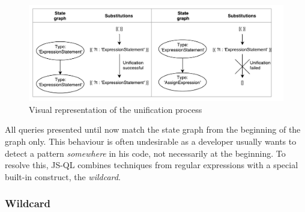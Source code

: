 \begin{figure}[!h]
    \centering
      \includegraphics[width=1\textwidth]{images/Unification} 
      \caption{Visual representation of the unification process}
    \label{fig:Unification}
\end{figure}

All queries presented until now match the state graph from the beginning of the graph only. This behaviour is often undesirable as a developer usually wants to detect a pattern \textit{somewhere} in his code, not necessarily at the beginning. To resolve this, JS-QL combines techniques from regular expressions with a special built-in construct, the \textit{wildcard}.


\subsubsection{Wildcard}

